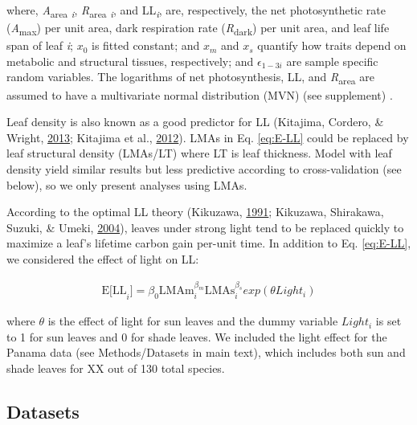 \documentclass[12pt,]{article}
\theoremstyle{definition}
\theoremstyle{definition}
\theoremstyle{definition}
\theoremstyle{remark}
\begin{document}
where, \emph{A}\textsubscript{area} \textsubscript{\emph{i}},
\emph{R}\textsubscript{area} \textsubscript{\emph{i}}, and
LL\textsubscript{\emph{i}}, are, respectively, the net photosynthetic
rate (\emph{A}\textsubscript{max}) per unit area, dark respiration rate
(\emph{R}\textsubscript{dark}) per unit area, and leaf life span of leaf
\emph{i}; \(x_0\) is fitted constant; and \(x_m\) and \(x_s\) quantify
how traits depend on metabolic and structural tissues, respectively; and
\(\epsilon_{1-3i}\) are sample specific random variables. The logarithms
of net photosynthesis, LL, and \emph{R}\textsubscript{area} are assumed
to have a multivariate normal distribution (MVN) (see supplement) .

Leaf density is also known as a good predictor for LL (Kitajima,
Cordero, \& Wright, \protect\hyperlink{ref-Kitajima2013}{2013}; Kitajima
et al., \protect\hyperlink{ref-Kitajima2012}{2012}). LMAs in Eq.
\eqref{eq:E-LL} could be replaced by leaf structural density (LMAs/LT)
where LT is leaf thickness. Model with leaf density yield similar
results but less predictive according to cross-validation (see below),
so we only present analyses using LMAs.

According to the optimal LL theory (Kikuzawa,
\protect\hyperlink{ref-Kikuzawa1991}{1991}; Kikuzawa, Shirakawa, Suzuki,
\& Umeki, \protect\hyperlink{ref-Kikuzawa2004}{2004}), leaves under
strong light tend to be replaced quickly to maximize a leaf's lifetime
carbon gain per-unit time. In addition to Eq. \eqref{eq:E-LL}, we
considered the effect of light on LL:

\begin{align}
\mathrm{E[LL}_i] = \beta_0\mathrm{LMAm}_{i}^{\beta_m} \mathrm{LMAs}_{i}^{\beta_s} exp(\theta Light_i) \label{eq:E-LL2}
\end{align}

where \(\theta\) is the effect of light for sun leaves and the dummy
variable \(Light_i\) is set to 1 for sun leaves and 0 for shade leaves.
We included the light effect for the Panama data (see Methods/Datasets
in main text), which includes both sun and shade leaves for XX out of
130 total species.

\hypertarget{datasets}{%
\subsection{Datasets}\label{datasets}}
\end{document}
